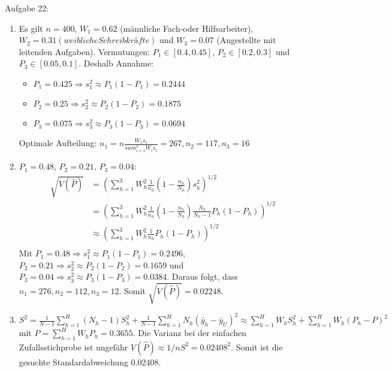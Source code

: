 \begin{Solution}{{Aufgabe 22:}}
\begin{enumerate}
	\item Es gilt $n=400$, $W_1 = 0.62$ (männliche Fach-oder Hilfsarbeiter), $W_2=0.31 (weibliche Schreibkräfte)$ und $W_3 = 0.07$ (Angestellte mit leitenden Aufgaben). Vermutungen: $P_1 \in [0.4,0.45]$, $P_2 \in [0.2,0.3]$ und $P_3 \in [0.05,0.1]$. Deshalb Annahme:
	\begin{itemize}
		\item $P_1 = 0.425 \Rightarrow s_1^2 \approx P_1(1-P_1) = 0.2444$
		\item $P_2 = 0.25 \Rightarrow s_2^2 \approx P_2(1-P_2) = 0.1875$
		\item $P_3 = 0.075 \Rightarrow s_3^2 \approx P_3(1-P_3) = 0.0694$
	\end{itemize}
	Optimale Aufteilung: $n_1 = n \frac{W_1 s_1}{sum_{i=1}^3 W_i s_i}=267, n_2 = 117, n_3 = 16$
	\item $P_1=0.48$, $P_2=0.21$, $P_3=0.04$:
	\begin{align*}
	\sqrt{V(\hat{P})} &= \left(\sum_{h=1}^3W_h^2\frac{1}{n_h}\left(1-\frac{n_h}{N_h}\right)s_h^2\right)^{1/2}\\
	&= \left(\sum_{h=1}^3W_h^2\frac{1}{n_h}\left(1-\frac{n_h}{N_h}\right)\frac{N_h}{N_h-1}P_h(1-P_h)\right)^{1/2}\\
	&\approx \left(\sum_{h=1}^3W_h^2\frac{1}{n_h} P_h(1-P_h)\right)^{1/2}\\
	\end{align*}
	Mit $P_1 = 0.48 \Rightarrow s_1^2 \approx P_1(1-P_1)=0.2496$, $P_2 = 0.21 \Rightarrow s_2^2 \approx P_2(1-P_2)=0.1659$ und $P_3 = 0.04 \Rightarrow s_3^2 \approx P_3(1-P_3)=0.0384$. Daraus folgt, dass $n_1=276,n_2=112,n_3=12$. Somit $\sqrt{V(\hat{P})} = 0.02248$.
	\item $S^2 = \frac{1}{N-1}\sum_{h=1}^H(N_h-1)S_h^2 + \frac{1}{N-1}\sum_{h=1}^H N_h(\bar{y}_h - \bar{y}_U)^2 \approx \sum_{h=1}^H W_h S_h^2 + \sum_{h=1}^H W_h(P_h-P)^2$ mit $P=\sum_{h=1}^H W_h P_h=0.3655$. Die Varianz bei der einfachen Zufallsstichprobe ist ungefähr $V(\hat{P}) \approx 1/n S^2 = 0.02408^2$. Somit ist die gesuchte Standardabweichung 0.02408.

\end{enumerate}
\end{Solution}
